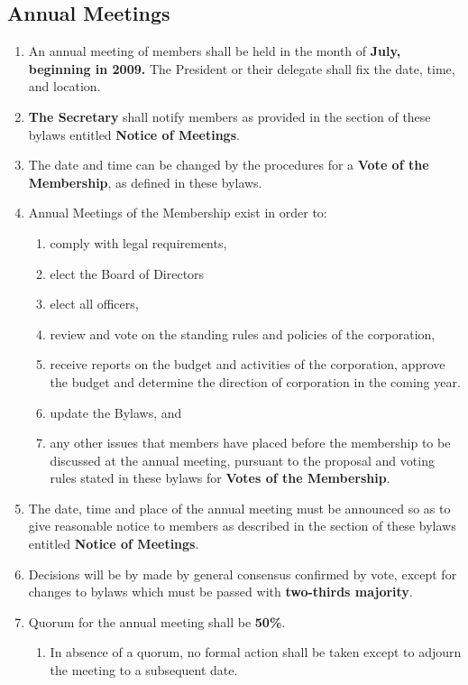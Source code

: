 \documentclass{article}
\begin{document}
\subsection{Annual Meetings}
\begin{enumerate}
    \item An annual meeting of members shall be held in the month of \textbf{July, beginning in 2009.} The President or their delegate shall fix the date, time,
    and location.
    \item \textbf{The Secretary} shall notify members as provided in the section of these
    bylaws entitled \textbf{Notice of Meetings}.
    \item The date and time can be changed by the procedures for a \textbf{Vote of the Membership}, as defined in these bylaws.
    \item Annual Meetings of the Membership exist in order to:
    \begin{enumerate}
        \item comply with legal requirements,
        \item elect the Board of Directors
        \item elect all officers,
        \item review and vote on the standing rules and policies of the
corporation,
        \item receive reports on the budget and activities of the corporation,
        approve the budget and determine the direction of corporation in the
        coming year.
        \item update the Bylaws, and
        \item any other issues that members have placed before the membership
        to be discussed at the annual meeting, pursuant to the proposal and
        voting rules stated in these bylaws for \textbf{Votes of the Membership}.
    \end{enumerate}
    \item The date, time and place of the annual meeting must be announced so as
    to give reasonable notice to members as described in the section of these
    bylaws entitled \textbf{Notice of Meetings}.
    \item Decisions will be by made by general consensus confirmed by vote,
    except for changes to bylaws which must be passed with \textbf{two-thirds majority}.
    \item Quorum for the annual meeting shall be \textbf{50\%}.
    \begin{enumerate}
        \item In absence of a quorum, no formal action shall be taken except to
        adjourn the meeting to a subsequent date.
    \end{enumerate}
\end{enumerate}
\end{document}
